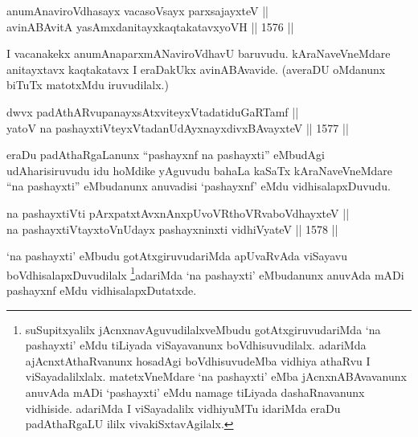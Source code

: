 \begin{shl}
anumAnaviroVdhasayx vacasoV\s sayx parxsajayxteV || \\
avinABAvitA yasAmxdanitayxkaqtakatavxyoVH \hfill || 1576 || 
\end{shl}

\begin{artha}
I vacanakekx anumAnaparxmANaviroVdhavU baruvudu. kAraNaveVneMdare anitayxtavx kaqtakatavx I eraDakUkx avinABAvavide. (averaDU oMdanunx biTuTx matotxMdu iruvudilalx.)
\end{artha}


\begin{shl}
dwvx padAthARvupanayxsAtxviteyxVtadatiduGaRTamf || \\
yatoV na pashayxtiVteyxVtadanUdAyxnayxdivxBAvayxteV \hfill || 1577 ||  
\end{shl}

\begin{artha}
eraDu padAthaRgaLanunx ``pashayxnf na pashayxti'' eMbudAgi udAharisiruvudu idu hoMdike yAguvudu bahaLa kaSaTx kAraNaveVneMdare ``na pashayxti'' eMbudanunx anuvadisi `pashayxnf' eMdu vidhisalapxDuvudu.
\end{artha}


\begin{shl}
na pashayxtiVti pArxpatxtAvxnAnxpUvoVR\s thoVR\s vaboVdhayxteV ||  \\
na pashayxtiVtayxtoV\s nUdayx pashayxninxti vidhiVyateV \hfill || 1578 ||  
\end{shl}

\begin{artha}
`na pashayxti' eMbudu gotAtxgiruvudariMda apUvaRvAda viSayavu boVdhisalapxDuvudilalx \footnote{suSupitxyalilx jAcnxnavAguvudilalxveMbudu gotAtxgiruvudariMda `na pashayxti' eMdu tiLiyada viSayavanunx boVdhisuvudilalx. adariMda ajAcnxtAthaRvanunx hosadAgi boVdhisuvudeMba vidhiya athaRvu I viSayadalilxlalx. matetxVneMdare `na pashayxti' eMba jAcnxnABAvavanunx anuvAda mADi `pashayxti' eMdu namage tiLiyada dashaRnavanunx vidhiside. adariMda I viSayadalilx vidhiyuMTu idariMda eraDu padAthaRgaLU ililx vivakiSxtavAgilalx.}adariMda `na pashayxti' eMbudanunx anuvAda mADi pashayxnf eMdu vidhisalapxDutatxde.
\end{artha}

